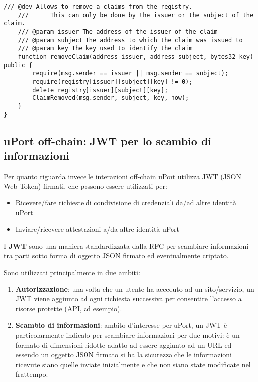 \begin{itemize}
\begin{lstlisting}[language=Solidity]
    /// @dev Allows to remove a claims from the registry.
    ///      This can only be done by the issuer or the subject of the claim.
    /// @param issuer The address of the issuer of the claim
    /// @param subject The address to which the claim was issued to
    /// @param key The key used to identify the claim
    function removeClaim(address issuer, address subject, bytes32 key) public {
        require(msg.sender == issuer || msg.sender == subject);
        require(registry[issuer][subject][key] != 0);
        delete registry[issuer][subject][key];
        ClaimRemoved(msg.sender, subject, key, now);
    }
}
  \end{lstlisting}
\end{itemize}

\subsection{uPort off-chain: JWT per lo scambio di informazioni}

Per quanto riguarda invece le interazioni off-chain uPort utilizza JWT (JSON Web Token)
firmati, che possono essere utilizzati per:
\begin{itemize}
  \item Ricevere/fare richieste di condivisione di credenziali da/ad altre identità uPort
  \item Inviare/ricevere attestazioni a/da altre identità uPort
\end{itemize}

I \textbf{JWT} sono una maniera standardizzata dalla RFC per scambiare informazioni
tra parti sotto forma di oggetto JSON firmato ed eventualmente criptato.

Sono utilizzati principalmente in due ambiti:
\begin{enumerate}
  \item \textbf{Autorizzazione}: una volta che un utente ha acceduto ad un sito/servizio,
  un JWT viene aggiunto ad ogni richiesta successiva per consentire
  l’accesso a risorse protette (API, ad esempio).
  \item \textbf{Scambio di informazioni}: ambito d’interesse per uPort,
  un JWT è particolarmente indicato per scambiare informazioni per due motivi:
  è un formato di dimensioni ridotte adatto ad essere aggiunto ad un URL
  ed essendo un oggetto JSON firmato si ha la sicurezza che le informazioni ricevute
  siano quelle inviate inizialmente e che non siano state modificate nel frattempo.
\end{enumerate}

